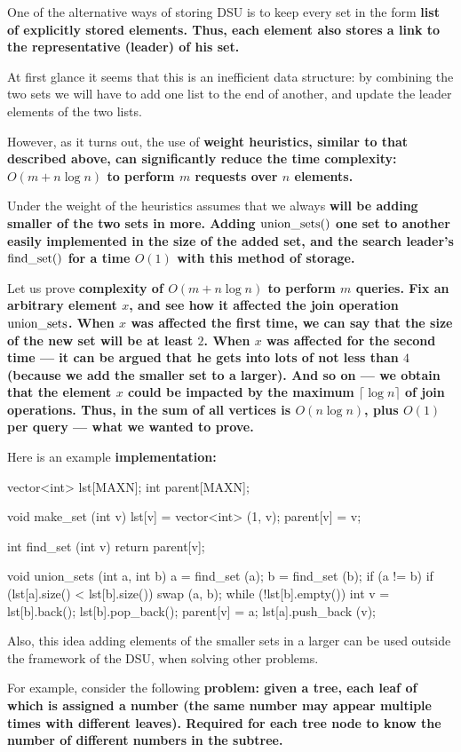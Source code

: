 One of the alternative ways of storing DSU is to keep every set in the form \bf{list of explicitly stored elements}. Thus, each element also stores a link to the representative (leader) of his set.

At first glance it seems that this is an inefficient data structure: by combining the two sets we will have to add one list to the end of another, and update the leader elements of the two lists.

However, as it turns out, the use of \bf{weight heuristics}, similar to that described above, can significantly reduce the time complexity: $O(m + n \log n)$ to perform $m$ requests over $n$ elements.

Under the weight of the heuristics assumes that we always \bf{will be adding smaller of the two sets in more}. Adding ${\rm union\_sets}()$ one set to another easily implemented in the size of the added set, and the search leader's ${\rm find\_set} ()$ for a time $O(1)$ with this method of storage.

Let us prove \bf{complexity} of $O(m + n \log n)$ to perform $m$ queries. Fix an arbitrary element $x$, and see how it affected the join operation ${\rm union\_sets}$. When $x$ was affected the first time, we can say that the size of the new set will be at least $2$. When $x$ was affected for the second time --- it can be argued that he gets into lots of not less than $4$ (because we add the smaller set to a larger). And so on --- we obtain that the element $x$ could be impacted by the maximum $\lceil \log n \rceil$ of join operations. Thus, in the sum of all vertices is $O (n \log n)$, plus $O(1)$ per query --- what we wanted to prove.

Here is an example \bf{implementation}:

\code
vector<int> lst[MAXN];
int parent[MAXN];

void make_set (int v) {
lst[v] = vector<int> (1, v);
parent[v] = v;
}

int find_set (int v) {
return parent[v];
}

void union_sets (int a, int b) {
a = find_set (a);
b = find_set (b);
if (a != b) {
if (lst[a].size() < lst[b].size())
swap (a, b);
while (!lst[b].empty()) {
int v = lst[b].back();
lst[b].pop_back();
parent[v] = a;
lst[a].push_back (v);
}
}
}
\endcode

Also, this idea adding elements of the smaller sets in a larger can be used outside the framework of the DSU, when solving other problems.

For example, consider the following \bf{problem}: given a tree, each leaf of which is assigned a number (the same number may appear multiple times with different leaves). Required for each tree node to know the number of different numbers in the subtree.


